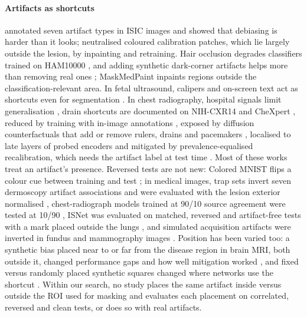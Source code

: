 \documentclass[review,3p]{elsarticle}
\begin{document}
\paragraph{Artifacts as shortcuts} \citet{bissoto2020debiasing} annotated seven artifact types in ISIC images and
showed that debiasing is harder than it looks; \citet{nauta2022uncovering} neutralised coloured calibration patches,
which lie largely outside the lesion, by inpainting and retraining. Hair occlusion degrades classifiers trained on
HAM10000 \citep{wang2024hair}, and adding synthetic dark-corner artifacts helps more than removing real ones
\citep{pewton2024dca}; MaskMedPaint \citep{maskmedpaint} inpaints regions outside the classification-relevant area. In
fetal ultrasound, calipers and on-screen text act as shortcuts even for segmentation \citep{lin2024segshortcut}. In
chest radiography, hospital signals limit generalisation \citep{zech2018variable}, drain shortcuts are documented on
NIH-CXR14 and CheXpert \citep{oakden2020hidden,jimenez2023shortcuts}, reduced by training with in-image annotations
\citep{rueckel2021pneumothorax}, exposed by diffusion counterfactuals that add or remove rulers, drains and
pacemakers \citep{weng2024fastdime}, localised to late layers of probed encoders \citep{pedersen2026probes} and mitigated
by prevalence-equalised recalibration, which needs the artifact label at test time \citep{kina2026prevalence}. Most of
these works treat an artifact's presence. Reversed tests are not new: Colored MNIST flips a colour cue between training
and test \citep{arjovsky2019irm}; in medical images, trap sets invert seven dermoscopy artifact associations and were
evaluated with the lesion exterior normalised \citep{bissoto2020debiasing}, chest-radiograph models trained at 90/10
source agreement were tested at 10/90 \citep{puli2022nurd}, ISNet was evaluated on matched, reversed and artifact-free
tests with a mark placed outside the lungs \citep{bassi2024isnet}, and simulated acquisition artifacts were inverted in
fundus and mammography images \citep{corbetta2026beyond}. Position has been varied too: a synthetic bias placed near to
or far from the disease region in brain MRI, both outside it, changed performance gaps and how well mitigation worked
\citep{stanley2024simba}, and fixed versus randomly placed synthetic squares changed where networks use the shortcut
\citep{boland2024shortcuts}. Within our search, no study places the same artifact inside versus outside the ROI used
for masking and evaluates each placement on correlated, reversed and clean tests, or does so with real artifacts.
\end{document}
